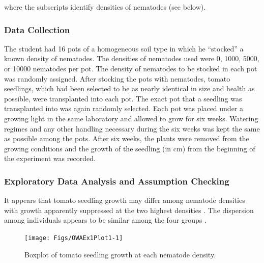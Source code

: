\documentclass[10pt,openany]{book}\usepackage[]{graphicx}\usepackage[]{color}
\newenvironment{knitrout}{}{} %
\begin{document}
where the subscripts identify densities of nematodes (see below).

\subsubsection*{Data Collection}
The student had 16 pots of a homogeneous soil type in which he ``stocked'' a known density of nematodes.  The densities of nematodes used were 0, 1000, 5000, or 10000 nematodes per pot.  The density of nematodes to be stocked in each pot was randomly assigned.  After stocking the pots with nematodes, tomato seedlings, which had been selected to be as nearly identical in size and health as possible, were transplanted into each pot.  The exact pot that a seedling was transplanted into was again randomly selected.  Each pot was placed under a growing light in the same laboratory and allowed to grow for six weeks.  Watering regimes and any other handling necessary during the six weeks was kept the same as possible among the pots.  After six weeks, the plants were removed from the growing conditions and the growth of the seedling (in cm) from the beginning of the experiment was recorded.

\subsubsection*{Exploratory Data Analysis and Assumption Checking}
It appears that tomato seedling growth may differ among nematode densities with growth apparently suppressed at the two highest densities .  The dispersion among individuals appears to be similar among the four groups .

\begin{knitrout}
\color{fgcolor}\begin{figure}[!h]

{\centering \texttt{[image: Figs/OWAEx1Plot1-1]} 

}

\caption[Boxplot of tomato seedling growth at each nematode density]{Boxplot of tomato seedling growth at each nematode density.}\label{fig:OWAEx1Plot1}
\end{figure}


\end{knitrout}
\end{document}
